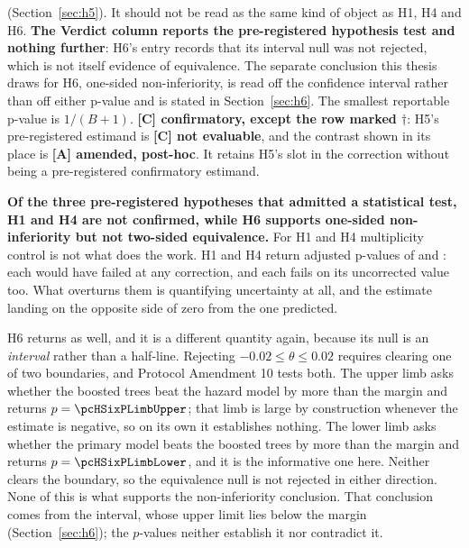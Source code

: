 \begin{table}[H]
{    (Section~\ref{sec:h5}). It should not be read as the same kind of object as
    H1, H4 and H6. \textbf{The Verdict column reports the pre-registered
    hypothesis test and nothing further}: H6's entry records that its interval
    null was not rejected, which is not itself evidence of equivalence. The
    separate conclusion this thesis draws for H6, one-sided non-inferiority,
    is read off the confidence interval rather than off either p-value and is
    stated in Section~\ref{sec:h6}. The
    smallest reportable p-value is $1/(B+1)$.
    \textbf{[C] confirmatory, except the row marked $\dagger$}: H5's
    pre-registered estimand is \textbf{[C] not evaluable}, and the contrast
    shown in its place is \textbf{[A] amended, post-hoc}. It retains H5's slot
    in the correction without being a pre-registered confirmatory estimand.}
    \label{tab:confirmatory}
\end{table}

\textbf{Of the three pre-registered hypotheses that admitted a statistical
test, H1 and H4 are not confirmed, while H6 supports one-sided non-inferiority
but not two-sided equivalence.} For H1 and H4 multiplicity control is not what
does the work. H1 and H4 return adjusted
p-values of \pcHOnePHolm{} and \pcHFourPHolm: each would have failed at any
correction, and each fails on its uncorrected value too. What overturns them is
quantifying uncertainty at all, and the estimate landing on the opposite side of
zero from the one predicted.

H6 returns \pcHSixPHolm{} as well, and it is a different quantity again,
because its null is an \emph{interval} rather than a half-line. Rejecting
$-0.02 \leq \theta \leq 0.02$ requires clearing one of two boundaries, and
Protocol Amendment 10 tests both. The upper limb asks whether the boosted trees
beat the hazard model by more than the margin and returns
$p = \pcHSixPLimbUpper$; that limb is large by construction whenever the
estimate is negative, so on its own it establishes nothing. The lower limb asks
whether the primary model beats the boosted trees by more than the margin and
returns $p = \pcHSixPLimbLower$, and it is the informative one here. Neither
clears the boundary, so the equivalence null is not rejected in either
direction. None of this is what supports the non-inferiority conclusion. That
conclusion comes from the interval, whose upper limit \pcHSixCiHi{} lies below
the margin (Section~\ref{sec:h6}); the $p$-values neither establish it nor
contradict it.

